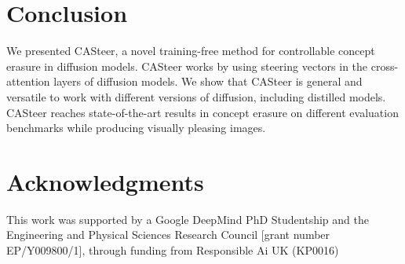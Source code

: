 \section{Conclusion}
\label{sec:conclusion}
We presented CASteer, a novel training-free method for controllable concept erasure in diffusion models.
%
CASteer works by using steering vectors in the cross-attention layers of diffusion models.
%
We show that CASteer is general and versatile to work with different versions of diffusion, including distilled models.
%
CASteer reaches state-of-the-art results in concept erasure on different evaluation benchmarks while producing visually pleasing images.

\clearpage


\section{Acknowledgments}
This work was supported by a Google DeepMind PhD Studentship and the Engineering and Physical Sciences Research Council [grant number EP/Y009800/1], through funding from Responsible Ai UK (KP0016)
